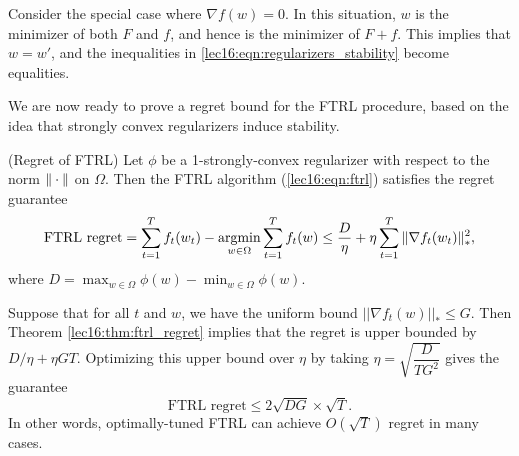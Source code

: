 \begin{remark}
Consider the special case where $\nabla f(w) = 0$. In this situation, $w$ is the minimizer of both $F$ and $f$, and hence is the minimizer of $F + f$. This implies that $w = w'$, and the inequalities in \eqref{lec16:eqn:regularizers_stability} become equalities.
\end{remark}

We are now ready to prove a regret bound for the FTRL procedure, based on the idea that strongly convex regularizers induce stability.

\begin{theorem}\label{lec16:thm:ftrl_regret}
\textup{(Regret of FTRL)} Let $\phi$ be a 1-strongly-convex regularizer with respect to the norm $\|\cdot\|$ on $\Omega$.  Then the FTRL algorithm (\ref{lec16:eqn:ftrl}) satisfies the regret guarantee
\begin{align}
\text{FTRL regret} = \sum_{t = 1}^T f_t(w_t) - \operatorname*{\textup{argmin}}_{w \in \Omega} \sum_{t = 1}^T f_t(w)  \leq \frac{D}{\eta} + \eta \sum_{t = 1}^T \|\nabla f_t(w_t)\|_*^2,
\end{align}
where $D = \max_{w \in \Omega} \phi(w) - \min_{w \in \Omega} \phi(w)$.
\end{theorem}

\begin{remark}
Suppose that for all $t$ and $w$, we have the uniform bound $|| \nabla f_t(w) ||_* \leq G$.  Then Theorem \ref{lec16:thm:ftrl_regret} implies that the regret is upper bounded by $D / \eta + \eta G T$.  Optimizing this upper bound over $\eta$ by taking $\eta = \sqrt{\dfrac{D}{TG^2}}$ gives the guarantee
\begin{equation}
\text{FTRL regret} \leq 2 \sqrt{D G} \times \sqrt{T}.
\end{equation}
In other words, optimally-tuned FTRL can achieve $O(\sqrt{T})$ regret in many cases.
\end{remark}


